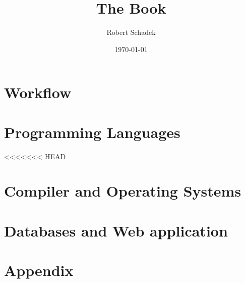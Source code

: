 \documentclass[b5paper,9pt,twocolumn]{book}
\title{The Book}
\author{Robert Schadek}
\date{\today}
\begin{document}
\maketitle
\setcounter{tocdepth}{5}
\setcounter{secnumdepth}{5}

\setlength{\parindent}{0cm}
\setlength{\columnsep}{6mm}
\tableofcontents

\part{Workflow}
\setlength{\columnseprule}{0.1pt}
%
%
%
%

\part{Programming Languages}
<<<<<<< HEAD
%
%

%
%
%
%

\part{Compiler and Operating Systems}
%

\part{Databases and Web application}
%

\part{Appendix}
\newpage
{}
\listoffigures

\newpage
{}
\lstlistoflistings
\end{document}
